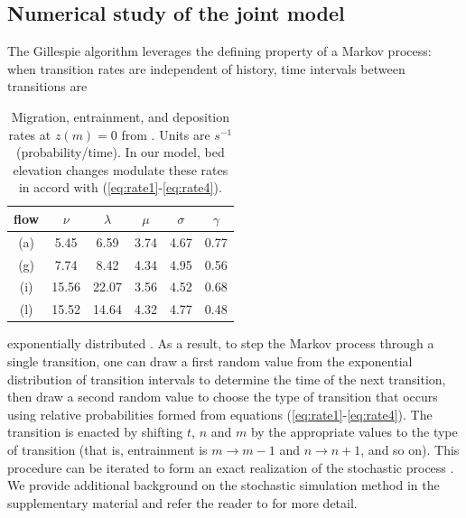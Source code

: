 \subsection{Numerical study of the joint model}
\label{sec:numerical}

The Gillespie algorithm leverages the defining property of a Markov process: when transition rates are independent of history, time intervals between transitions are \begin{table}
	\caption{Migration, entrainment, and deposition rates at $z(m)=0$ from \citet{Ancey2008}. Units are $s^{-1}$ (probability/time). In our model, bed elevation changes modulate these rates in accord with (\ref{eq:rate1}-\ref{eq:rate4}).}\label{tab:anceyparams}
	\begin{tabular}{cccccc} \\ 
		\toprule  
		flow & $\nu$ & $\lambda$ & $\mu$ & $\sigma$ & $\gamma$ \\
		\midrule
		(a) & 5.45  & 6.59  & 3.74 & 4.67 & 0.77 \\
		\midrule
		(g) & 7.74  & 8.42  & 4.34 & 4.95 & 0.56 \\
		\midrule
		(i) & 15.56 & 22.07 & 3.56 & 4.52 & 0.68 \\
		\midrule
		(l) & 15.52 & 14.64 & 4.32 & 4.77 & 0.48 \\
		\bottomrule
	\end{tabular}
\end{table}exponentially distributed \citep{Cox1965}.
As a result, to step the Markov process through a single transition, one can draw a first random value from the exponential distribution of transition intervals to determine the time of the next transition,
then draw a second random value to choose the type of transition that occurs using relative probabilities formed from equations (\ref{eq:rate1}-\ref{eq:rate4}). The transition is enacted by shifting $t$, $n$ and $m$ by the appropriate values to the type of transition (that is, entrainment is $m\rightarrow m-1$ and $n \rightarrow n+1$, and so on).
This procedure can be iterated to form an exact realization of the stochastic process \citep{Gillespie2007}.
We provide additional background on the stochastic simulation method in the supplementary material and refer the reader to \citet{Gillespie2007} for more detail.


